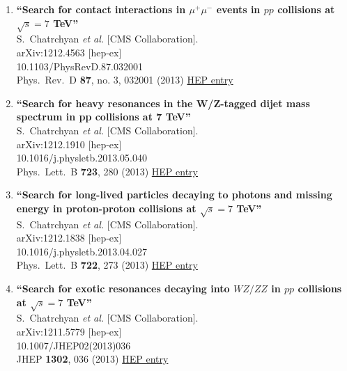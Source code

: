 \documentclass{article}
\begin{document}
\begin{enumerate}
\item%
{\bf ``Search for contact interactions in $\mu^+\mu^-$ events in $pp$ collisions at $\sqrt{s}=7$ TeV''}
  \\{}S.~Chatrchyan {\it et al.} [CMS Collaboration].
  \\{}arXiv:1212.4563 [hep-ex]
    \\{}10.1103/PhysRevD.87.032001
\\{}Phys.\ Rev.\ D {\bf 87}, no. 3, 032001 (2013) %
\href{http://inspirehep.net/record/1208097}{HEP entry}


\item%
{\bf ``Search for heavy resonances in the W/Z-tagged dijet mass spectrum in pp collisions at 7 TeV''}
  \\{}S.~Chatrchyan {\it et al.} [CMS Collaboration].
  \\{}arXiv:1212.1910 [hep-ex]
    \\{}10.1016/j.physletb.2013.05.040
\\{}Phys.\ Lett.\ B {\bf 723}, 280 (2013) %
\href{http://inspirehep.net/record/1206606}{HEP entry}


\item%
{\bf ``Search for long-lived particles decaying to photons and missing energy in proton-proton collisions at $\sqrt{s}=7$ TeV''}
  \\{}S.~Chatrchyan {\it et al.} [CMS Collaboration].
  \\{}arXiv:1212.1838 [hep-ex]
    \\{}10.1016/j.physletb.2013.04.027
\\{}Phys.\ Lett.\ B {\bf 722}, 273 (2013) %
\href{http://inspirehep.net/record/1206603}{HEP entry}


\item%
{\bf ``Search for exotic resonances decaying into $WZ/ZZ$ in $pp$ collisions at $\sqrt{s}=7$ TeV''}
  \\{}S.~Chatrchyan {\it et al.} [CMS Collaboration].
  \\{}arXiv:1211.5779 [hep-ex]
    \\{}10.1007/JHEP02(2013)036
\\{}JHEP {\bf 1302}, 036 (2013) %
\href{http://inspirehep.net/record/1203843}{HEP entry}



\end{enumerate}
\end{document}

